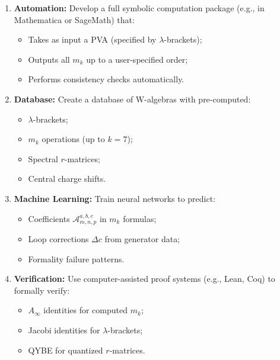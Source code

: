 \begin{enumerate}
\item \textbf{Automation:} Develop a full symbolic computation package (e.g., in Mathematica or SageMath) that:
\begin{itemize}
\item Takes as input a PVA (specified by $\lambda$-brackets);
\item Outputs all $m_k$ up to a user-specified order;
\item Performs consistency checks automatically.
\end{itemize}

\item \textbf{Database:} Create a database of W-algebras with pre-computed:
\begin{itemize}
\item $\lambda$-brackets;
\item $m_k$ operations (up to $k=7$);
\item Spectral $r$-matrices;
\item Central charge shifts.
\end{itemize}

\item \textbf{Machine Learning:} Train neural networks to predict:
\begin{itemize}
\item Coefficients $\mathcal{A}^{a,b,c}_{m,n,p}$ in $m_k$ formulas;
\item Loop corrections $\Delta c$ from generator data;
\item Formality failure patterns.
\end{itemize}

\item \textbf{Verification:} Use computer-assisted proof systems (e.g., Lean, Coq) to formally verify:
\begin{itemize}
\item $A_\infty$ identities for computed $m_k$;
\item Jacobi identities for $\lambda$-brackets;
\item QYBE for quantized $r$-matrices.
\end{itemize}
\end{enumerate}



